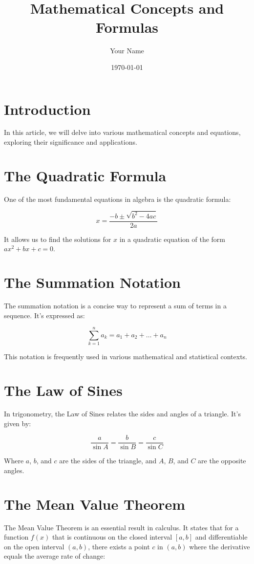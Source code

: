\documentclass{article}
\title{Mathematical Concepts and Formulas}
\author{Your Name}
\date{\today}
\begin{document}
\maketitle

\section{Introduction}
In this article, we will delve into various mathematical concepts and equations, exploring their significance and applications.

\section{The Quadratic Formula}
One of the most fundamental equations in algebra is the quadratic formula:

\begin{equation}
    x = \frac{-b \pm \sqrt{b^2 - 4ac}}{2a}
\end{equation}

It allows us to find the solutions for $x$ in a quadratic equation of the form $ax^2 + bx + c = 0$.

\section{The Summation Notation}
The summation notation is a concise way to represent a sum of terms in a sequence. It's expressed as:

\begin{equation}
    \sum_{k=1}^n a_k = a_1 + a_2 + \ldots + a_n
\end{equation}

This notation is frequently used in various mathematical and statistical contexts.

\section{The Law of Sines}
In trigonometry, the Law of Sines relates the sides and angles of a triangle. It's given by:

\begin{equation}
    \frac{a}{\sin A} = \frac{b}{\sin B} = \frac{c}{\sin C}
\end{equation}

Where $a$, $b$, and $c$ are the sides of the triangle, and $A$, $B$, and $C$ are the opposite angles.

\section{The Mean Value Theorem}
The Mean Value Theorem is an essential result in calculus. It states that for a function $f(x)$ that is continuous on the closed interval $[a, b]$ and differentiable on the open interval $(a, b)$, there exists a point $c$ in $(a, b)$ where the derivative equals the average rate of change:
\end{document}

